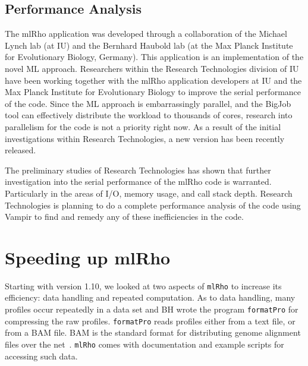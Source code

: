 \documentclass{sig-alternate}
\newcommand{\ty}{\texttt}
\begin{document}
\subsection{Performance Analysis}\label{subsec:analysis}
The mlRho application was developed through a collaboration of the Michael Lynch lab (at IU) and the Bernhard
Haubold lab (at the Max Planck Institute for Evolutionary Biology, Germany). This application is an implementation of
the novel ML approach. Researchers within the Research Technologies division of IU have been working together
with the mlRho application developers at IU and the Max Planck Institute for Evolutionary Biology to improve
the serial performance of the code. Since the ML approach is embarrassingly parallel, and the BigJob tool can
effectively distribute the workload to thousands of cores, research into parallelism for the code is not a priority right now. As a result of the initial investigations within Research Technologies, a new version has been recently released. 

The preliminary studies of Research Technologies has shown that further investigation into the serial
performance of the mlRho code is warranted. Particularly in the areas of I/O, memory usage, and call stack
depth. Research Technologies is planning to do a complete performance analysis of the code using Vampir to
find and remedy any of these inefficiencies in the code. 


\section{Speeding up mlRho}
Starting with version 1.10, we looked at two aspects of \ty{mlRho} to
increase its efficiency: data handling and repeated
computation. As to data handling, many profiles occur repeatedly in a
data set and BH wrote the program \ty{formatPro} for compressing the raw
profiles. \ty{formatPro} reads profiles either from a text file, or from a BAM
file. BAM is the standard format for distributing genome alignment
files over the net~\citep{li09:seq}. \ty{mlRho} comes with documentation and example
scripts for accessing such data.
\end{document}
